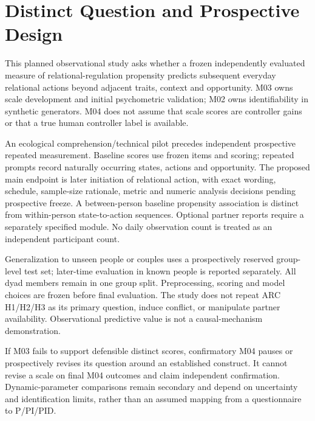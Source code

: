 \section{Distinct Question and Prospective Design}

This planned observational study asks whether a frozen independently evaluated measure of relational-regulation propensity predicts subsequent everyday relational actions beyond adjacent traits, context and opportunity. M03 owns scale development and initial psychometric validation; M02 owns identifiability in synthetic generators. M04 does not assume that scale scores are controller gains or that a true human controller label is available.

An ecological comprehension/technical pilot precedes independent prospective repeated measurement. Baseline scores use frozen items and scoring; repeated prompts record naturally occurring states, actions and opportunity. The proposed main endpoint is later initiation of relational action, with exact wording, schedule, sample-size rationale, metric and numeric analysis decisions pending prospective freeze. A between-person baseline propensity association is distinct from within-person state-to-action sequences. Optional partner reports require a separately specified module. No daily observation count is treated as an independent participant count.

Generalization to unseen people or couples uses a prospectively reserved group-level test set; later-time evaluation in known people is reported separately. All dyad members remain in one group split. Preprocessing, scoring and model choices are frozen before final evaluation. The study does not repeat ARC H1/H2/H3 as its primary question, induce conflict, or manipulate partner availability. Observational predictive value is not a causal-mechanism demonstration.

If M03 fails to support defensible distinct scores, confirmatory M04 pauses or prospectively revises its question around an established construct. It cannot revise a scale on final M04 outcomes and claim independent confirmation. Dynamic-parameter comparisons remain secondary and depend on uncertainty and identification limits, rather than an assumed mapping from a questionnaire to P/PI/PID.
